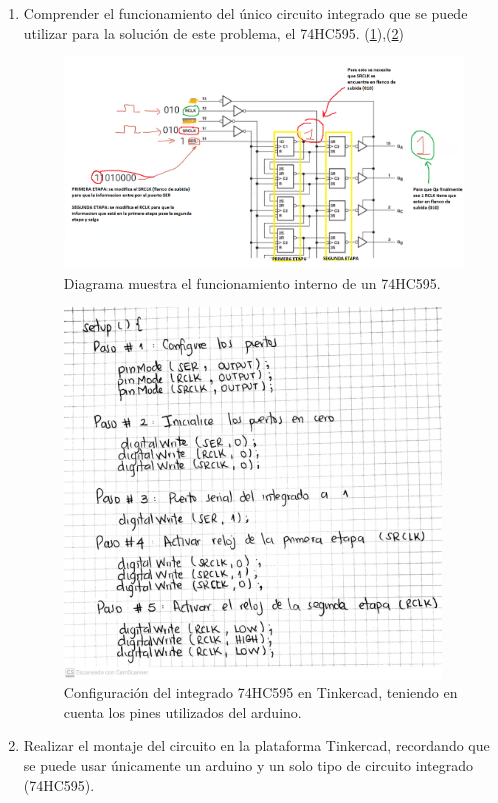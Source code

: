 \documentclass{article}
\begin{document}
\begin{enumerate}
  \item Comprender el funcionamiento del único circuito integrado que se puede utilizar para la solución de este problema, el 74HC595. (\ref{fig:Funcionamiento74HC595}),(\ref{fig:setup})
  
 \begin{figure}[h]
\includegraphics[scale=0.4]{FUNCIONAMIENTO74HC595.png}
\centering
\caption{Diagrama muestra el funcionamiento interno de un 74HC595.}
\label{fig:Funcionamiento74HC595}
\end{figure}
\newpage

\begin{figure}[h]
\includegraphics[width=10cm]{SETUP.jpeg}
\centering
\caption{Configuración del integrado 74HC595 en Tinkercad, teniendo en cuenta los pines utilizados del arduino.}
\label{fig:setup}
\end{figure}

  \item Realizar el montaje del circuito en la plataforma Tinkercad, recordando que se puede usar únicamente un arduino y un solo tipo de circuito integrado (74HC595).


\end{enumerate}
\end{document}
